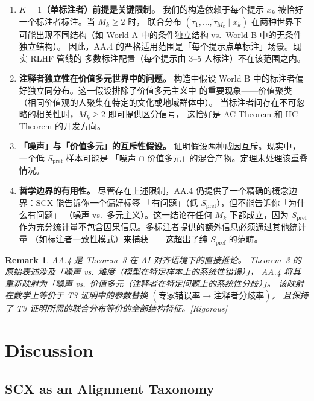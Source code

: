\documentclass[12pt,a4paper]{article}
\newtheorem{remark}[theorem]{Remark}
\newcommand{\rigorous}{\textcolor{green!50!black}{\small\textsf{[Rigorous]}}}
\begin{document}
\begin{enumerate}
    \item \textbf{$K=1$（单标注者）前提是关键限制。}
    我们的构造依赖于每个提示 $x_k$ 被恰好一个标注者标注。当 $M_k \geq 2$ 时，
    联合分布 $(\tilde{\tau}_1,\dots,\tilde{\tau}_{M_k}\mid x_k)$ 在两种世界下
    可能出现不同结构（如 World A 中的条件独立结构 vs.\ World B 中的无条件独立结构）。
    因此，AA.4 的严格适用范围是「每个提示点单标注」场景。现实 RLHF 管线的
    多数标注配置（每个提示由 3--5 人标注）不在该范围之内。
    \item \textbf{注释者独立性在价值多元世界中的问题。}
    构造中假设 World B 中的标注者偏好独立同分布。这一假设排除了价值多元主义中
    的重要现象——价值聚类（相同价值观的人聚集在特定的文化或地域群体中）。
    当标注者间存在不可忽略的相关性时，$M_k\geq 2$ 即可提供区分信号，
    这恰好是 AC-Theorem 和 HC-Theorem 的开发方向。
    \item \textbf{「噪声」与「价值多元」的互斥性假设。}
    证明假设两种成因互斥。现实中，一个低 $S_{\mathrm{pref}}$ 样本可能是
    「噪声 $\cap$ 价值多元」的混合产物。定理未处理该重叠情况。
    \item \textbf{哲学边界的有用性。}
    尽管存在上述限制，AA.4 仍提供了一个精确的概念边界：SCX 能告诉你一个偏好标签
    「有问题」（低 $S_{\mathrm{pref}}$），但不能告诉你「为什么有问题」
    （噪声 vs.\ 多元主义）。这一结论在任何 $M_k$ 下都成立，因为 $S_{\mathrm{pref}}$
    作为充分统计量不包含因果信息。多标注者提供的额外信息必须通过其他统计量
    （如标注者一致性模式）来捕获——这超出了纯 $S_{\mathrm{pref}}$ 的范畴。
\end{enumerate}

\begin{remark}
AA.4 是 Theorem~3 在 AI 对齐语境下的直接推论。
Theorem~3 的原始表述涉及「噪声 vs.\ 难度（模型在特定样本上的系统性错误）」，
AA.4 将其重新映射为「噪声 vs.\ 价值多元（注释者在特定问题上的系统性分歧）」。
该映射在数学上等价于 T3 证明中的参数替换
$(\text{专家错误率} \rightarrow \text{注释者分歧率})$，
且保持了 T3 证明所需的联合分布等价的全部结构特征。\rigorous
\end{remark}

\section{Discussion}

\subsection{SCX as an Alignment Taxonomy}
\end{document}
